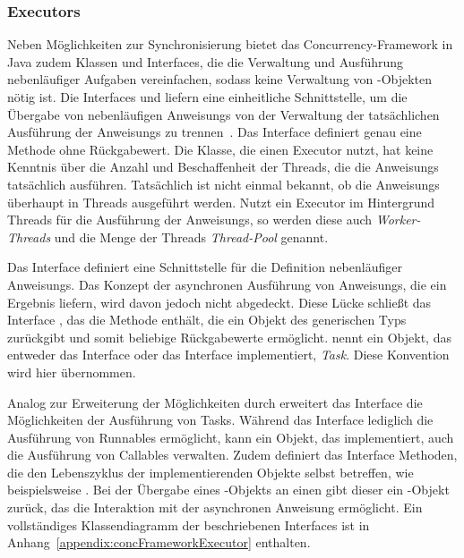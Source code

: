 \subsubsection{Executors}\label{sec:executor} Neben Möglichkeiten zur Synchronisierung bietet das Concurrency-Framework in Java zudem Klassen und Interfaces, die die Verwaltung und Ausführung nebenläufiger Aufgaben vereinfachen, sodass keine Verwaltung von \classThread{}-Objekten nötig ist. Die Interfaces \classExecutor{} und \classExecutorService{} liefern eine einheitliche Schnittstelle, um die Übergabe von nebenläufigen \glspl{Anweisung} von der Verwaltung der tatsächlichen Ausführung der \glspl{Anweisung} zu trennen~\cite[S.~70~\psqq]{Friesen2015}. Das Interface \classExecutor{} definiert genau eine Methode  ohne Rückgabewert. Die Klasse, die einen Executor nutzt, hat keine Kenntnis über die Anzahl und Beschaffenheit der Threads, die die \glspl{Anweisung} tatsächlich ausführen. Tatsächlich ist nicht einmal bekannt, ob die \glspl{Anweisung} überhaupt in Threads ausgeführt werden. Nutzt ein Executor im Hintergrund Threads für die Ausführung der \glspl{Anweisung}, so werden diese auch \emph{Worker-Threads} und die Menge der Threads \emph{Thread-Pool} genannt.

Das Interface \classRunnable{} definiert eine Schnittstelle für die Definition nebenläufiger \glspl{Anweisung}. Das Konzept der asynchronen Ausführung von \glspl{Anweisung}, die ein Ergebnis liefern, wird davon jedoch nicht abgedeckt. Diese Lücke schließt das Interface , das die Methode  enthält, die ein Objekt des generischen Typs  zurückgibt und somit beliebige Rückgabewerte ermöglicht. \textcite{Friesen2015} nennt ein Objekt, das entweder das Interface \classRunnable{} oder das Interface \classCallable{} implementiert, \emph{Task}. Diese Konvention wird hier übernommen. 

Analog zur Erweiterung der Möglichkeiten durch \classCallable{} erweitert das Interface \classExecutorService{} die Möglichkeiten der Ausführung von Tasks. Während das Interface \classExecutor{} lediglich die Ausführung von Runnables ermöglicht, kann ein Objekt, das \classExecutorService{} implementiert, auch die Ausführung von Callables verwalten. Zudem definiert das Interface Methoden, die den Lebenszyklus der implementierenden Objekte selbst betreffen, wie beispielsweise . Bei der Übergabe eines -Objekts an einen \classExecutorService{} gibt dieser ein -Objekt zurück, das die Interaktion mit der asynchronen \gls{Anweisung} ermöglicht. Ein vollständiges Klassendiagramm der beschriebenen Interfaces ist in Anhang~\vref{appendix:concFrameworkExecutor} enthalten.

